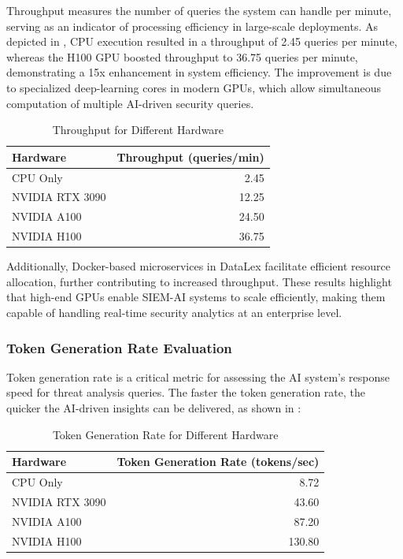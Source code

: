 Throughput measures the number of queries the system can handle per minute, serving as an indicator of processing efficiency in large-scale deployments. As depicted in , CPU execution resulted in a throughput of 2.45 queries per minute, whereas the H100 GPU boosted throughput to 36.75 queries per minute, demonstrating a 15x enhancement in system efficiency. The improvement is due to specialized deep-learning cores in modern GPUs, which allow simultaneous computation of multiple AI-driven security queries.

\begin{table}[h!]
\centering
\begin{tabular}{lr}
\hline
\textbf{Hardware} & \textbf{Throughput (queries/min)} \\
\hline
CPU Only & 2.45 \\
NVIDIA RTX 3090 & 12.25 \\
NVIDIA A100 & 24.50 \\
NVIDIA H100 & 36.75 \\
\hline
\end{tabular}
\caption{Throughput for Different Hardware}
\label{tab:throughput-hardware}
\end{table}

Additionally, Docker-based microservices in DataLex facilitate efficient resource allocation, further contributing to increased throughput. These results highlight that high-end GPUs enable SIEM-AI systems to scale efficiently, making them capable of handling real-time security analytics at an enterprise level.

\subsubsection{Token Generation Rate Evaluation}
\label{subsubsec_token_generation_rate_evaluation}

Token generation rate is a critical metric for assessing the AI system's response speed for threat analysis queries. The faster the token generation rate, the quicker the AI-driven insights can be delivered, as shown in :

\begin{table}[h!]
\centering
\begin{tabular}{lr}
\hline
\textbf{Hardware} & \textbf{Token Generation Rate (tokens/sec)} \\
\hline
CPU Only & 8.72 \\
NVIDIA RTX 3090 & 43.60 \\
NVIDIA A100 & 87.20 \\
NVIDIA H100 & 130.80 \\
\hline
\end{tabular}
\caption{Token Generation Rate for Different Hardware}
\label{tab:token-generation-rate-hardware}
\end{table}

